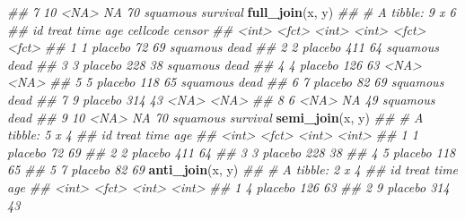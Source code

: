 \documentclass[
]{book}
\newenvironment{Shaded}{\begin{snugshade}}{\end{snugshade}}
\newcommand{\CommentTok}[1]{\textcolor[rgb]{0.56,0.35,0.01}{\textit{#1}}}
\newcommand{\KeywordTok}[1]{\textcolor[rgb]{0.13,0.29,0.53}{\textbf{#1}}}
\newcommand{\NormalTok}[1]{#1}
\begin{document}
\begin{Shaded}
\begin{Highlighting}[]
\CommentTok{\#\# 7    10 \textless{}NA\textgreater{}       NA    70 squamous survival}
\KeywordTok{full\_join}\NormalTok{(x, y) }
\CommentTok{\#\# \# A tibble: 9 x 6}
\CommentTok{\#\#      id treat    time   age cellcode censor  }
\CommentTok{\#\#   \textless{}int\textgreater{} \textless{}fct\textgreater{}   \textless{}int\textgreater{} \textless{}int\textgreater{} \textless{}fct\textgreater{}    \textless{}fct\textgreater{}   }
\CommentTok{\#\# 1     1 placebo    72    69 squamous dead    }
\CommentTok{\#\# 2     2 placebo   411    64 squamous dead    }
\CommentTok{\#\# 3     3 placebo   228    38 squamous dead    }
\CommentTok{\#\# 4     4 placebo   126    63 \textless{}NA\textgreater{}     \textless{}NA\textgreater{}    }
\CommentTok{\#\# 5     5 placebo   118    65 squamous dead    }
\CommentTok{\#\# 6     7 placebo    82    69 squamous dead    }
\CommentTok{\#\# 7     9 placebo   314    43 \textless{}NA\textgreater{}     \textless{}NA\textgreater{}    }
\CommentTok{\#\# 8     6 \textless{}NA\textgreater{}       NA    49 squamous dead    }
\CommentTok{\#\# 9    10 \textless{}NA\textgreater{}       NA    70 squamous survival}
\KeywordTok{semi\_join}\NormalTok{(x, y) }
\CommentTok{\#\# \# A tibble: 5 x 4}
\CommentTok{\#\#      id treat    time   age}
\CommentTok{\#\#   \textless{}int\textgreater{} \textless{}fct\textgreater{}   \textless{}int\textgreater{} \textless{}int\textgreater{}}
\CommentTok{\#\# 1     1 placebo    72    69}
\CommentTok{\#\# 2     2 placebo   411    64}
\CommentTok{\#\# 3     3 placebo   228    38}
\CommentTok{\#\# 4     5 placebo   118    65}
\CommentTok{\#\# 5     7 placebo    82    69}
\KeywordTok{anti\_join}\NormalTok{(x, y) }
\CommentTok{\#\# \# A tibble: 2 x 4}
\CommentTok{\#\#      id treat    time   age}
\CommentTok{\#\#   \textless{}int\textgreater{} \textless{}fct\textgreater{}   \textless{}int\textgreater{} \textless{}int\textgreater{}}
\CommentTok{\#\# 1     4 placebo   126    63}
\CommentTok{\#\# 2     9 placebo   314    43}
\end{Highlighting}
\end{Shaded}


  
\end{document}
